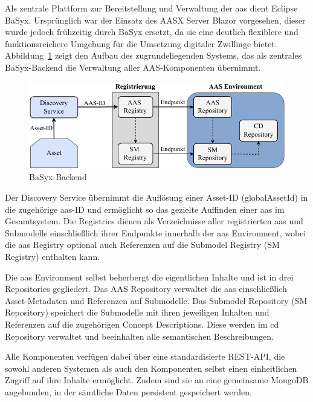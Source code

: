 Als zentrale Plattform zur Bereitstellung und Verwaltung der \acs{aas} dient Eclipse BaSyx.
Ursprünglich war der Einsatz des AASX Server Blazor vorgesehen, dieser wurde jedoch frühzeitig durch BaSyx ersetzt, da sie eine deutlich flexiblere und funktionsreichere Umgebung für die Umsetzung digitaler Zwillinge bietet.
Abbildung~\ref{fig:BaSyxArchitektur} zeigt den Aufbau des zugrundeliegenden Systems, das als zentrales BaSyx-Backend die Verwaltung aller AAS-Komponenten übernimmt.

\begin{figure}[htbp]
    \centering
        \includegraphics[width=1\textwidth]{Bilder/Ergebnisse/Systemarchitektur/BaSyx.pdf}
    \caption{BaSyx-Backend}
    \label{fig:BaSyxArchitektur}
\end{figure}

Der Discovery Service übernimmt die Auflösung einer Asset-ID (globalAssetId) in die zugehörige \acs{aas}-ID und ermöglicht so das gezielte Auffinden einer \acs{aas} im Gesamtsystem. 
Die Registries dienen als Verzeichnisse aller registrierten \acs{aas} und Submodelle einschließlich ihrer Endpunkte innerhalb der \acs{aas} Environment, wobei die \acs{aas} Registry optional auch Referenzen auf die Submodel Registry (SM Registry) enthalten kann. 

Die \acs{aas} Environment selbst beherbergt die eigentlichen Inhalte und ist in drei Repositories gegliedert. 
Das AAS Repository verwaltet die \acs{aas} einschließlich Asset-Metadaten und Referenzen auf Submodelle. 
Das Submodel Repository (SM Repository) speichert die Submodelle mit ihren jeweiligen Inhalten und Referenzen auf die zugehörigen Concept Descriptions. 
Diese werden im \acs{cd} Repository verwaltet und beeinhalten alle semantischen Beschreibungen.

Alle Komponenten verfügen dabei über eine standardisierte REST-API, die sowohl anderen Systemen als auch den Komponenten selbst einen einheitlichen Zugriff auf ihre Inhalte ermöglicht. 
Zudem sind sie an eine gemeinsame MongoDB angebunden, in der sämtliche Daten persistent gespeichert werden.

